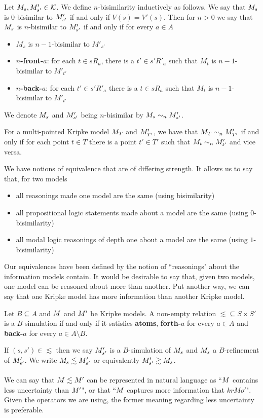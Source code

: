 \begin{defn} \label{nBisimKripke}
Let $M_s, M'_{s'} \in \mathcal{K}$.
We define $n$-bisimilarity inductively as follows.
We say that $M_s$ is $0$-bisimilar to $M'_{s'}$ if and only if $V(s) = V'(s)$.
Then for $n > 0$ we say that $M_s$ is $n$-bisimilar to $M'_{s'}$ if and only if for every $a \in A$
\begin{itemize}
	\item $M_s$ is $n-1$-bisimilar to $M'_{s'}$
	\item {\bf $n$-front-$a$}: for each $t \in s R_a$, there is a $t' \in s' R'_a$ such that $M_t$ is
	$n-1$-bisimilar to $M'_{t'}$
	\item {\bf $n$-back-$a$}: for each $t' \in s' R'_a$ there is a $t \in s R_a$ such that $M_t$ is
	$n-1$-bisimilar to $M'_{t'}$
\end{itemize}
We denote $M_s$ and $M'_{s'}$ being $n$-bisimilar by $M_s \sim_n
M'_{s'}$.
\end{defn}
For a multi-pointed Kripke model $M_T$ and $M'_{T'}$, we have that
$M_T \sim_n
M'_{T'}$ if and only if for each point $t \in T$ there is a point $t' \in T'$
such that $M_t \sim_n M'_{t'}$ and vice versa.

We have notions of equivalence that are of differing strength.
It allows us to say that, for two models
\begin{itemize}
	\item all reasonings made one model are the same (using bisimilarity)
	\item all propositional logic statements made about a model are the same (using $0$-bisimilarity)
	\item all modal logic reasonings of depth one about a model are the same (using $1$-bisimilarity)
\end{itemize}

Our equivalences have been defined by the notion of ``reasonings" about the information models
contain.
It would be desirable to say that, given two models, one model can be reasoned about more than
another.
Put another way, we can say that one Kripke model has more information than another Kripke model.

\begin{defn} \label{refinement}
Let $B \subseteq A$ and $M$ and $M'$ be Kripke models. A non-empty relation $\lesssim \subseteq S
\times S'$ is a $B$-simulation if and only if it satisfies {\bf atoms}, {\bf forth-$a$} for
every $a \in A$ and {\bf back-$a$} for every $a \in A \setminus B$.
\end{defn}
If $(s, s') \in \lesssim$ then we say $M'_{s'}$ is a
$B$-simulation of $M_s$ and
$M_s$ a $B$-refinement of $M'_{s'}$.
We write $M_{s} \lesssim M'_{s'}$ or equivalently
$M'_{s'} \gtrsim M_{s}$.\\
\\
We can say that $M \lesssim M'$ can be represented in natural language as ``$M$ contains
less uncertainty than $M'$", or that ``$M$ captures more information that $krMo'$".
Given the operators we are using, the former meaning regarding less uncertainty is preferable.


